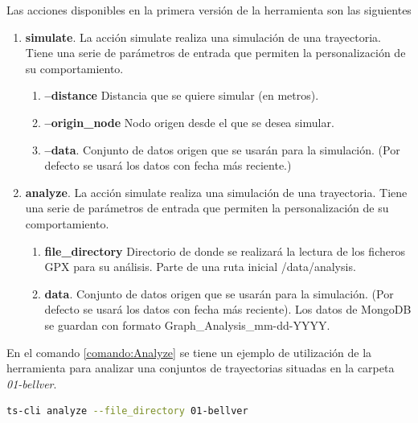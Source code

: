 Las acciones disponibles en la primera versión de la herramienta son las siguientes

\begin{enumerate}[label={A.\arabic*.}]
\item \textbf{simulate}. La acción simulate realiza una simulación de una trayectoria. Tiene una serie de parámetros de entrada que permiten la personalización de su comportamiento.

\begin{enumerate}[label*={P.\arabic*.}]
\item \textbf{--distance} Distancia que se quiere simular (en metros).

\item \textbf{--origin\_node} Nodo origen desde el que se desea simular.

\item \textbf{--data}. Conjunto de datos origen que se usarán para la simulación. (Por defecto se usará los datos con fecha más reciente.)
\end{enumerate}

\item \textbf{analyze}. La acción simulate realiza una simulación de una trayectoria. Tiene una serie de parámetros de entrada que permiten la personalización de su comportamiento.

\begin{enumerate}[label*={P.\arabic*.}]
\item \textbf{\-\-file\_directory} Directorio de donde se realizará la lectura de los ficheros \ac{GPX} para su análisis. Parte de una ruta inicial \slash data\slash analysis.

\item \textbf{\-\-data}. Conjunto de datos origen que se usarán para la simulación. (Por defecto se usará los datos con fecha más reciente). Los datos de MongoDB se guardan con formato Graph\_Analysis\_mm-dd-YYYY.
\end{enumerate}
\end{enumerate}

En el comando \ref{comando:Analyze} se tiene un ejemplo de utilización de la herramienta para analizar una conjuntos de trayectorias situadas en la carpeta \textit{01-bellver}.

\begin{lstlisting}[caption={Ejecución análisis}, language=bash, label={comando:Analyze}] 
	ts-cli analyze --file_directory 01-bellver
\end{lstlisting}

